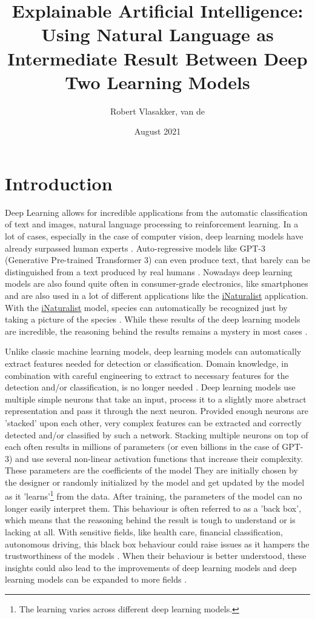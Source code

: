 \documentclass{article}
\title{Explainable Artificial Intelligence: Using Natural Language as Intermediate Result Between Deep Two Learning Models}
\author{Robert Vlasakker, van de}
\date{August 2021}
\begin{document}
\maketitle

\section{Introduction}
Deep Learning allows for incredible applications from the automatic classification of text and images, natural language processing to reinforcement learning.
In a lot of cases, especially in the case of computer vision, deep learning models have already surpassed human experts \cite{he_delving_2015}.
Auto-regressive models like GPT-3 (Generative Pre-trained Transformer 3) can even produce text, that barely can be distinguished from a text produced by real humans \cite{brown_language_2020}.
Nowadays deep learning models are also found quite often in consumer-grade electronics, like smartphones and are also used in a lot of different applications like the \href{https://www.inaturalist.org/}{iNaturalist} application.
With the \href{https://www.inaturalist.org/}{iNaturalist} model, species can automatically be recognized just by taking a picture of the species \cite{radford_learning_2021}.
While these results of the deep learning models are incredible, the reasoning behind the results remains a mystery in most cases \cite{li_interpretable_2021, losch_interpretability_2019}.

Unlike classic machine learning models, deep learning models can automatically extract features needed for detection or classification.
Domain knowledge, in combination with careful engineering to extract to necessary features for the detection and/or classification, is no longer needed \cite{lecun_deep_2015}.
Deep learning models use multiple simple neurons that take an input, process it to a slightly more abstract representation and pass it through the next neuron.
Provided enough neurons are 'stacked' upon each other, very complex features can be extracted and correctly detected and/or classified by such a network.
Stacking multiple neurons on top of each often results in millions of parameters (or even billions in the case of GPT-3) and use several non-linear activation functions that increase their complexity.
These parameters are the coefficients of the model
They are initially chosen by the designer or randomly initialized by the model and get updated by the model as it 'learns'\footnote{The learning varies across different deep learning models.} from the data.
After training, the parameters of the  model can no longer easily interpret them.
This behaviour is often referred to as a 'back box', which means that the reasoning behind the result is tough to understand or is lacking at all.
With sensitive fields, like health care, financial classification, autonomous driving, this black box behaviour could raise issues as it hampers the trustworthiness of the models \cite{carvalho_machine_2019}.
When their behaviour is better understood, these insights could also lead to the improvements of deep learning models \cite{amershi_modeltracker_2015} and deep learning models can be expanded to more fields \cite{lei_opening_2018}.
\end{document}
